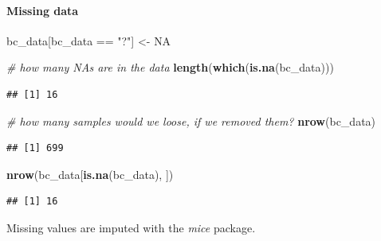 \documentclass[]{article}
\newenvironment{Shaded}{\begin{snugshade}}{\end{snugshade}}
\newcommand{\KeywordTok}[1]{\textcolor[rgb]{0.13,0.29,0.53}{\textbf{{#1}}}}
\newcommand{\StringTok}[1]{\textcolor[rgb]{0.31,0.60,0.02}{{#1}}}
\newcommand{\CommentTok}[1]{\textcolor[rgb]{0.56,0.35,0.01}{\textit{{#1}}}}
\newcommand{\OtherTok}[1]{\textcolor[rgb]{0.56,0.35,0.01}{{#1}}}
\newcommand{\NormalTok}[1]{{#1}}
\let\oldparagraph\paragraph
\renewcommand{\paragraph}[1]{\oldparagraph{#1}\mbox{}}
\begin{document}
\paragraph{Missing data}\label{missing-data}

\begin{Shaded}
\begin{Highlighting}[]
\NormalTok{bc_data[bc_data ==}\StringTok{ "?"}\NormalTok{] <-}\StringTok{ }\OtherTok{NA}

\CommentTok{# how many NAs are in the data}
\KeywordTok{length}\NormalTok{(}\KeywordTok{which}\NormalTok{(}\KeywordTok{is.na}\NormalTok{(bc_data)))}
\end{Highlighting}
\end{Shaded}

\begin{verbatim}
## [1] 16
\end{verbatim}

\begin{Shaded}
\begin{Highlighting}[]
\CommentTok{# how many samples would we loose, if we removed them?}
\KeywordTok{nrow}\NormalTok{(bc_data)}
\end{Highlighting}
\end{Shaded}

\begin{verbatim}
## [1] 699
\end{verbatim}

\begin{Shaded}
\begin{Highlighting}[]
\KeywordTok{nrow}\NormalTok{(bc_data[}\KeywordTok{is.na}\NormalTok{(bc_data), ])}
\end{Highlighting}
\end{Shaded}

\begin{verbatim}
## [1] 16
\end{verbatim}

Missing values are imputed with the \emph{mice} package.
\end{document}
